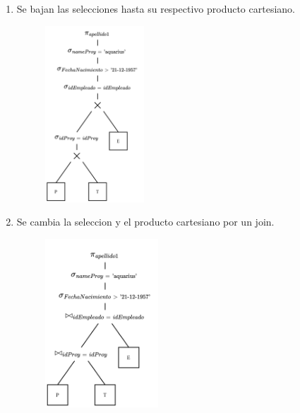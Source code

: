 \documentclass{templateNote}
\begin{document}
\begin{enumerate}
\begin{enumerate}
\begin{enumerate}
            \item Se bajan las selecciones hasta su respectivo producto cartesiano.
            \begin{figure}[H]
                \centering
                \includegraphics[width=0.35\textwidth]{img/E1-Paso3.png}
            \end{figure}

            \newpage
            \item Se cambia la seleccion y el producto cartesiano por un join.
            \begin{figure}[H]
                \centering
                \includegraphics[width=0.4\textwidth]{img/E1-Paso4.png}
            \end{figure}


\end{enumerate}
\end{enumerate}
\end{enumerate}
\end{document}
